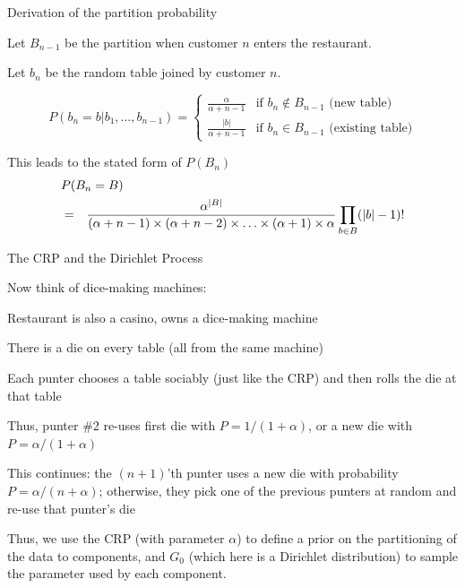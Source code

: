 \documentclass{beamer}
\begin{document}
\begin{frame}{Derivation of the partition probability}

Let $B_{n-1}$ be the partition when customer $n$ enters the restaurant.

Let $b_n$ be the random table joined by customer $n$.

\[
P(b_n=b|b_1,\ldots,b_{n-1}) = \left\{ \begin{array}{ll}
\frac{\alpha}{\alpha + n - 1} & \mbox{if $b_n \notin B_{n-1}$ (new table)} \\
\frac{|b|}{\alpha + n - 1} & \mbox{if $b_n \in B_{n-1}$ (existing table)}
\end{array} \right.
\]

This leads to the stated form of $P(B_n)$
\begin{eqnarray*}
\lefteqn{P(B_n = B)} \\
& = & \frac{\alpha^{|B|}}{(\alpha+n-1) \times (\alpha+n-2) \times \ldots \times (\alpha+1) \times \alpha}
 \prod_{b \in B} (|b|-1)!
\end{eqnarray*}


\end{frame}




\begin{frame}{The CRP and the Dirichlet Process}

Now think of dice-making machines:
\itemb
\item Restaurant is also a casino, owns a dice-making machine
\item There is a die on every table (all from the same machine)
\item Each punter chooses a table sociably (just like the CRP) and then rolls the die at that table
\item Thus, punter \#2 re-uses first die with $P=1/(1+\alpha)$, or a new die with $P=\alpha/(1+\alpha)$
\item This continues: the $(n+1)$'th punter uses a new die with probability $P=\alpha/(n+\alpha)$; otherwise, they pick one of the previous punters at random and re-use that punter's die
\iteme

Thus, we use the CRP (with parameter $\alpha$) to define a prior on the partitioning of the data to components,
and $G_0$ (which here is a Dirichlet distribution) to sample the parameter used by each component.

\end{frame}
\end{document}
